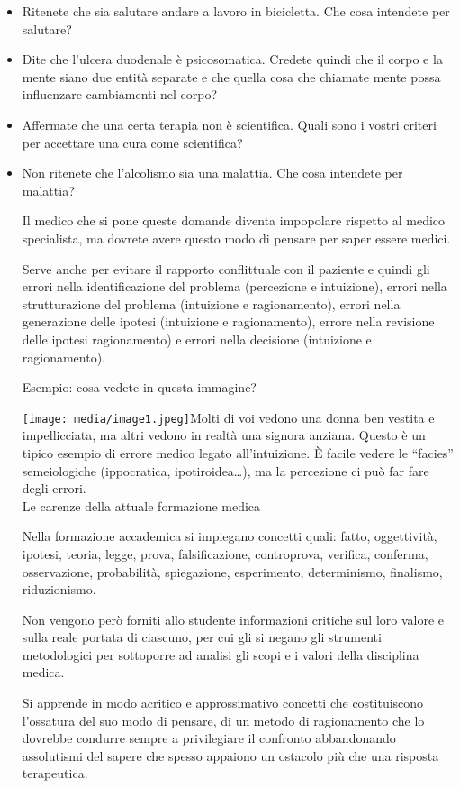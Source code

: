 \documentclass[]{article}
\begin{document}
\begin{itemize}
\item
  Ritenete che sia salutare andare a lavoro in bicicletta. Che cosa
  intendete per salutare?
\item
  Dite che l'ulcera duodenale è psicosomatica. Credete quindi che il
  corpo e la mente siano due entità separate e che quella cosa che
  chiamate mente possa influenzare cambiamenti nel corpo?
\item
  Affermate che una certa terapia non è scientifica. Quali sono i vostri
  criteri per accettare una cura come scientifica?
\item
  Non ritenete che l'alcolismo sia una malattia. Che cosa intendete per
  malattia?

  Il medico che si pone queste domande diventa impopolare rispetto al
  medico specialista, ma dovrete avere questo modo di pensare per saper
  essere medici.

  Serve anche per evitare il rapporto conflittuale con il paziente e
  quindi gli errori nella identificazione del problema (percezione e
  intuizione), errori nella strutturazione del problema (intuizione e
  ragionamento), errori nella generazione delle ipotesi (intuizione e
  ragionamento), errore nella revisione delle ipotesi ragionamento) e
  errori nella decisione (intuizione e ragionamento).

  Esempio: cosa vedete in questa immagine?

  \texttt{[image: media/image1.jpeg]}Molti
  di voi vedono una donna ben vestita e impellicciata, ma altri vedono
  in realtà una signora anziana. Questo è un tipico esempio di errore
  medico legato all'intuizione. È facile vedere le ``facies''
  semeiologiche (ippocratica, ipotiroidea\ldots{}), ma la percezione ci
  può far fare degli errori.\\
  Le carenze della attuale formazione medica

  Nella formazione accademica si impiegano concetti quali: fatto,
  oggettività, ipotesi, teoria, legge, prova, falsificazione,
  controprova, verifica, conferma, osservazione, probabilità,
  spiegazione, esperimento, determinismo, finalismo, riduzionismo.

  Non vengono però forniti allo studente informazioni critiche sul loro
  valore e sulla reale portata di ciascuno, per cui gli si negano gli
  strumenti metodologici per sottoporre ad analisi gli scopi e i valori
  della disciplina medica.

  Si apprende in modo acritico e approssimativo concetti che
  costituiscono l'ossatura del suo modo di pensare, di un metodo di
  ragionamento che lo dovrebbe condurre sempre a privilegiare il
  confronto abbandonando assolutismi del sapere che spesso appaiono un
  ostacolo più che una risposta terapeutica.


\end{itemize}
\end{document}
